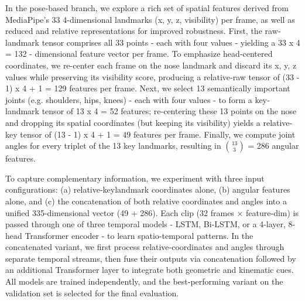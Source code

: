 \documentclass[journal,onecolumn, 11pt]{IEEEtran}
\begin{document}
In the pose‐based branch, we explore a rich set of spatial features derived from MediaPipe’s 33 4-dimensional landmarks (x, y, z, visibility) per frame, as well as reduced and relative representations for improved robustness. First, the raw‐landmark tensor comprises all 33 points - each with four values - yielding a 33 x 4 = 132 - dimensional feature vector per frame. To emphasize head‐centered coordinates, we re-center each frame on the nose landmark and discard its x, y, z values while preserving its visibility score, producing a relative‐raw tensor of (33 - 1) x 4 + 1 = 129 features per frame. Next, we select 13 semantically important joints (e.g. shoulders, hips, knees) - each with four values - to form a key‐landmark tensor of 13 x 4 = 52 features; re-centering these 13 points on the nose and dropping its spatial coordinates (but keeping its visibility) yields a relative‐key tensor of (13 - 1) x 4 + 1 = 49 features per frame. Finally, we compute joint angles for every triplet of the 13 key landmarks, resulting in $\binom{13}{3}$ = 286 angular features.

To capture complementary information, we experiment with three input configurations: (a) relative‐keylandmark coordinates alone, (b) angular features alone, and (c) the concatenation of both relative coordinates and angles into a unified 335-dimensional vector (49 + 286). Each clip (32 frames × feature‐dim) is passed through one of three temporal models - LSTM, Bi-LSTM, or a 4-layer, 8-head Transformer encoder - to learn spatio-temporal patterns. In the concatenated variant, we first process relative‐coordinates and angles through separate temporal streams, then fuse their outputs via concatenation followed by an additional Transformer layer to integrate both geometric and kinematic cues. All models are trained independently, and the best‐performing variant on the validation set is selected for the final evaluation.

\end{document}
